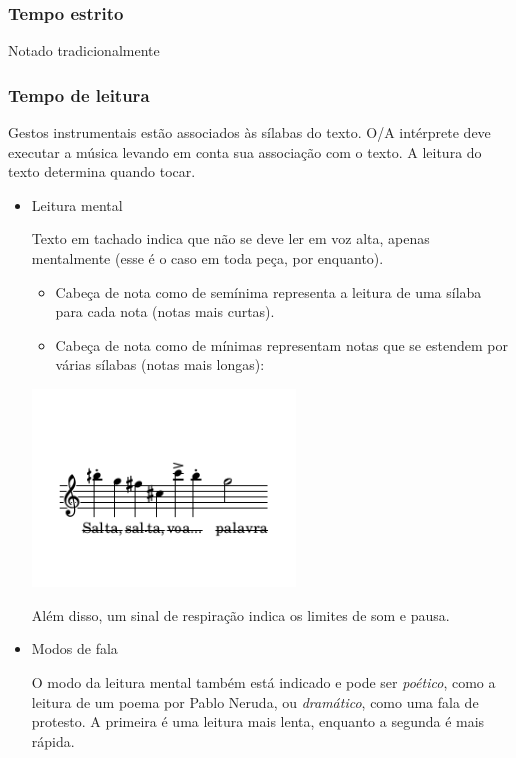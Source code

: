 \documentclass[article,12pt,openany,oneside,a4paper,chapter=TITLE,hyphen,english,brazil,chapter=TITLE,sumario=tradicional]{abntex2}
\begin{document}
\subsubsection*{Tempo estrito}
\label{sec:orgcc2e305}

Notado tradicionalmente

\subsubsection*{Tempo de leitura}
\label{sec:org1da9c46}

Gestos instrumentais estão associados às sílabas do texto. O/A intérprete deve executar a música levando em conta sua associação com o texto. A leitura do texto determina quando tocar. 

\begin{itemize}
\item Leitura mental
\label{sec:org1d8b387}

Texto em tachado indica que não se deve ler em voz alta, apenas mentalmente (esse é o caso em toda peça, por enquanto).

\begin{itemize}
\item Cabeça de nota como de semínima representa a leitura de uma sílaba para cada nota (notas mais curtas).
\item Cabeça de nota como de mínimas representam notas que se estendem por várias sílabas (notas mais longas):
\end{itemize}

\begin{center}
\includegraphics[width=7cm]{exemplo_tempo_fala.pdf}
\end{center}

Além disso, um sinal de respiração indica os limites de som e pausa.

\item Modos de fala
\label{sec:org1b63f6a}

O modo da leitura mental também está indicado e pode ser \emph{poético}, como a leitura de um poema por Pablo Neruda, ou \emph{dramático}, como uma fala de protesto. A primeira é uma leitura mais lenta, enquanto a segunda é mais rápida.


\end{itemize}
\end{document}
